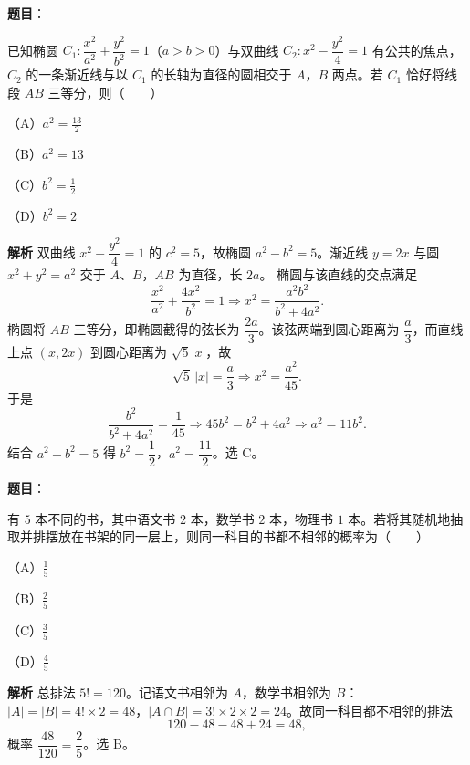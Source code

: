 \begin{answer}

\textbf{题目}：

已知椭圆 $C_1:\dfrac{x^2}{a^2}+\dfrac{y^2}{b^2}=1$（$a>b>0$）与双曲线 $C_2:x^2-\dfrac{y^2}{4}=1$ 有公共的焦点，$C_2$ 的一条渐近线与以 $C_1$ 的长轴为直径的圆相交于 $A$，$B$ 两点。若 $C_1$ 恰好将线段 $AB$ 三等分，则\mbox{（　　）}

（A）$a^2=\frac{13}2$

（B）$a^2=13$

（C）$b^2=\frac12$

（D）$b^2=2$

\textbf{解析}
双曲线 $x^2-\dfrac{y^2}4=1$ 的 $c^2=5$，故椭圆 $a^2-b^2=5$。渐近线 $y=2x$ 与圆 $x^2+y^2=a^2$ 交于 $A$、$B$，$AB$ 为直径，长 $2a$。
椭圆与该直线的交点满足
\nopagebreak[4]
\[\frac{x^2}{a^2}+\frac{4x^2}{b^2}=1\Longrightarrow x^2=\frac{a^2b^2}{b^2+4a^2}.\]
椭圆将 $AB$ 三等分，即椭圆截得的弦长为 $\dfrac{2a}3$。该弦两端到圆心距离为 $\dfrac a3$，而直线上点 $(x,2x)$ 到圆心距离为 $\sqrt5|x|$，故
\nopagebreak[4]
\[\sqrt5\,|x|=\frac a3\Longrightarrow x^2=\frac{a^2}{45}.\]
于是
\nopagebreak[4]
\[\frac{b^2}{b^2+4a^2}=\frac1{45}\Longrightarrow45b^2=b^2+4a^2\Longrightarrow a^2=11b^2.\]
结合 $a^2-b^2=5$ 得 $b^2=\dfrac12$，$a^2=\dfrac{11}2$。选 C。


\end{answer}
\begin{answer}

\textbf{题目}：

有 $5$ 本不同的书，其中语文书 $2$ 本，数学书 $2$ 本，物理书 $1$ 本。若将其随机地抽取并排摆放在书架的同一层上，则同一科目的书都不相邻的概率为\mbox{（　　）}

（A）$\frac15$

（B）$\frac25$

（C）$\frac35$

（D）$\frac45$

\textbf{解析}
总排法 $5!=120$。记语文书相邻为 $A$，数学书相邻为 $B$：$|A|=|B|=4!\times2=48$，$|A\cap B|=3!\times2\times2=24$。故同一科目都不相邻的排法
\nopagebreak[4]
\[120-48-48+24=48,\]
概率 $\dfrac{48}{120}=\dfrac25$。选 B。


\end{answer}
